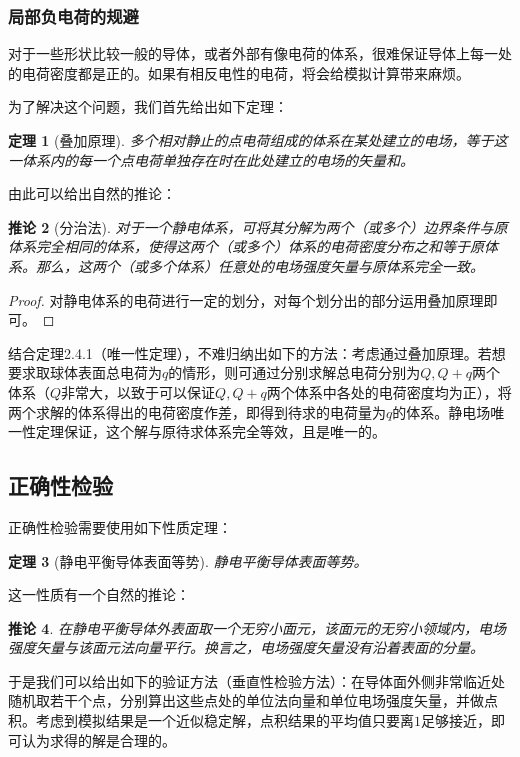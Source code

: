 \documentclass[UTF8]{article}
\numberwithin{figure}{subsection}
\numberwithin{table}{subsection}
\newtheorem{theorem}{\indent 定理}[subsection]
\newtheorem{corollary}[theorem]{\indent 推论}
\begin{document}
\begin{multicols}{2}
    \subsubsection{局部负电荷的规避}
    \par 对于一些形状比较一般的导体，或者外部有像电荷的体系，很难保证导体上每一处的电荷密度都是正的。如果有相反电性的电荷，将会给模拟计算带来麻烦。
    \par 为了解决这个问题，我们首先给出如下定理：
    \begin{theorem}[叠加原理]
        多个相对静止的点电荷组成的体系在某处建立的电场，等于这一体系内的每一个点电荷单独存在时在此处建立的电场的矢量和。
    \end{theorem}
    由此可以给出自然的推论：
    \begin{corollary}[分治法]
        对于一个静电体系，可将其分解为两个（或多个）边界条件与原体系完全相同的体系，使得这两个（或多个）体系的电荷密度分布之和等于原体系。那么，这两个（或多个体系）任意处的电场强度矢量与原体系完全一致。
    \end{corollary}
    \begin{proof}
        对静电体系的电荷进行一定的划分，对每个划分出的部分运用叠加原理即可。
    \end{proof}
    \par 结合定理2.4.1（唯一性定理），不难归纳出如下的方法：考虑通过叠加原理。若想要求取球体表面总电荷为$q$的情形，则可通过分别求解总电荷分别为$Q,Q+q$两个体系（$Q$非常大，以致于可以保证$Q,Q+q$两个体系中各处的电荷密度均为正），将两个求解的体系得出的电荷密度作差，即得到待求的电荷量为$q$的体系。静电场唯一性定理保证，这个解与原待求体系完全等效，且是唯一的。
    \subsection{正确性检验}
        正确性检验需要使用如下性质定理：
        \begin{theorem}[静电平衡导体表面等势]
            静电平衡导体表面等势。
        \end{theorem}
        这一性质有一个自然的推论：
        \begin{corollary}
            在静电平衡导体外表面取一个无穷小面元，该面元的无穷小领域内，电场强度矢量与该面元法向量平行。换言之，电场强度矢量没有沿着表面的分量。
        \end{corollary}
        \par 于是我们可以给出如下的验证方法（垂直性检验方法）：在导体面外侧非常临近处随机取若干个点，分别算出这些点处的单位法向量和单位电场强度矢量，并做点积。考虑到模拟结果是一个近似稳定解，点积结果的平均值只要离$1$足够接近，即可认为求得的解是合理的。


\end{multicols}
\end{document}
